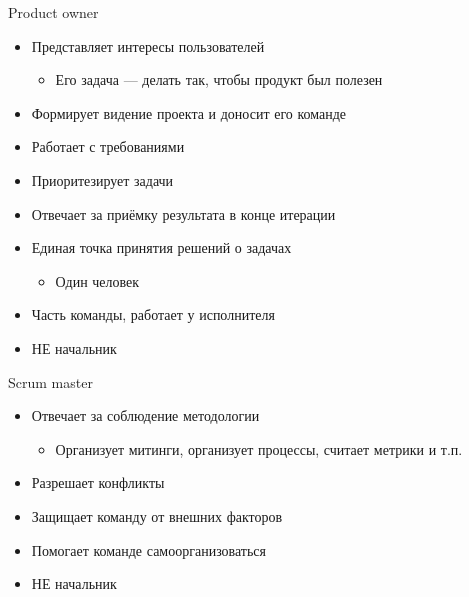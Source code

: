 \documentclass{../../slides-style}
\begin{document}
    \begin{frame}{Product owner}
        \begin{itemize}
            \item Представляет интересы пользователей
            \begin{itemize}
                \item Его задача --- делать так, чтобы продукт был полезен
            \end{itemize}
            \item Формирует видение проекта и доносит его команде
            \item Работает с требованиями
            \item Приоритезирует задачи
            \item Отвечает за приёмку результата в конце итерации
            \item Единая точка принятия решений о задачах
            \begin{itemize}
                \item Один человек
            \end{itemize}
            \item Часть команды, работает у исполнителя
            \item НЕ начальник
        \end{itemize}
    \end{frame}

    \begin{frame}{Scrum master}
        \begin{itemize}
            \item Отвечает за соблюдение методологии
            \begin{itemize}
                \item Организует митинги, организует процессы, считает метрики и т.п.
            \end{itemize}
            \item Разрешает конфликты
            \item Защищает команду от внешних факторов
            \item Помогает команде самоорганизоваться
            \item НЕ начальник
        \end{itemize}
    \end{frame}
\end{document}
